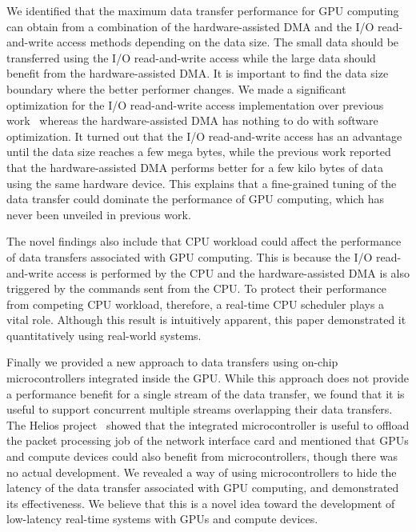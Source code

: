 We identified that the maximum data transfer performance for GPU
computing can obtain from a combination of the hardware-assisted DMA and
the I/O read-and-write access methods depending on the data size.
The small data should be transferred using the I/O read-and-write access
while the large data should benefit from the hardware-assisted DMA.
It is important to find the data size boundary where the better
performer changes.
We made a significant optimization for the I/O read-and-write access
implementation over previous work~\cite{Kato_ATC12} whereas the
hardware-assisted DMA has nothing to do with software optimization.
It turned out that the I/O read-and-write access has an advantage until
the data size reaches a few mega bytes, while the previous work reported
that the hardware-assisted DMA performs better for a few kilo bytes of
data using the same hardware device.
This explains that a fine-grained tuning of the data transfer could
dominate the performance of GPU computing, which has never been unveiled
in previous work.

The novel findings also include that CPU workload could affect the
performance of data transfers associated with GPU computing.
This is because the I/O read-and-write access is performed by the CPU
and the hardware-assisted DMA is also triggered by the commands sent
from the CPU.
To protect their performance from competing CPU workload, therefore, a
real-time CPU scheduler plays a vital role.
Although this result is intuitively apparent, this paper demonstrated it
quantitatively using real-world systems.

Finally we provided a new approach to data transfers using on-chip
microcontrollers integrated inside the GPU. 
While this approach does not provide a performance benefit for a single
stream of the data transfer, we found that it is useful to support
concurrent multiple streams overlapping their data transfers.
The Helios project~\cite{Nightingale09} showed that the integrated
microcontroller is useful to offload the packet processing job of the
network interface card and mentioned that GPUs and compute devices could
also benefit from microcontrollers, though there was no actual
development.
We revealed a way of using microcontrollers to hide the latency of the
data transfer associated with GPU computing, and demonstrated its
effectiveness.
We believe that this is a novel idea toward the development of
low-latency real-time systems with GPUs and compute devices.